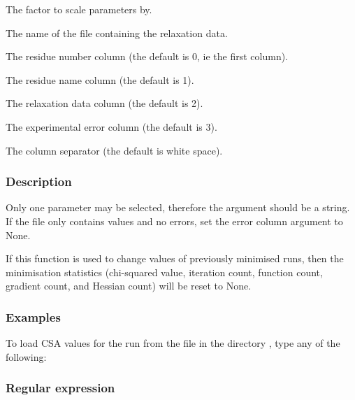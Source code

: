   The factor to scale parameters by. 

  The name of the file containing the relaxation data. 

  The residue number column (the default is 0, ie the first column). 

  The residue name column (the default is 1). 

  The relaxation data column (the default is 2). 

  The experimental error column (the default is 3). 

  The column separator (the default is white space). 




\subsubsection{Description}

Only one parameter may be selected, therefore the  argument should be a string.  If the file only contains values and no errors, set the error column argument to None.


If this function is used to change values of previously minimised runs, then the minimisation statistics (chi-squared value, iteration count, function count, gradient count, and Hessian count) will be reset to None.



\subsubsection{Examples}

To load CSA values for the run  from the file  in the directory , type any of the following:






\subsubsection{Regular expression}

